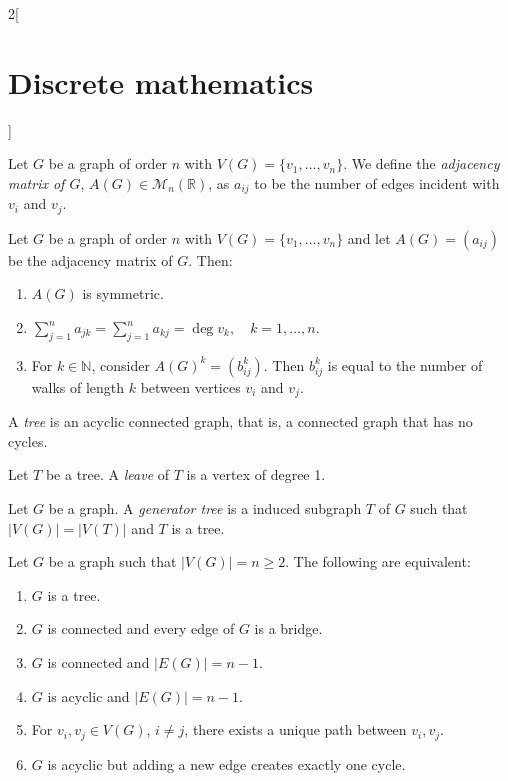 \documentclass[class=article,10pt,crop=false]{standalone}
\begin{document}
\begin{multicols}{2}[\section{Discrete mathematics}]
\begin{definition}
Let $G$ be a graph of order $n$ with $V(G)=\{v_1,\ldots,v_n\}$. We define the \textit{adjacency matrix of $G$}, $A(G)\in\mathcal{M}_n(\mathbb{R})$, as $a_{ij}$ to be the number of edges incident with $v_i$ and $v_j$.
\end{definition}
\begin{prop}
Let $G$ be a graph of order $n$ with $V(G)=\{v_1,\ldots,v_n\}$ and let $A(G)=(a_{ij})$ be the adjacency matrix of $G$. Then:
\begin{enumerate}
    \item $A(G)$ is symmetric.
    \item $\displaystyle\sum_{j=1}^n a_{jk}=\sum_{j=1}^n a_{kj}=\deg v_k,\quad k=1,\ldots,n$.
    \item For $k\in\mathbb{N}$, consider $A(G)^k=(b_{ij}^k)$. Then $b_{ij}^k$ is equal to the number of walks of length $k$ between vertices $v_i$ and $v_j$.
\end{enumerate}
\end{prop}
\begin{definition}
A \textit{tree} is an acyclic connected graph, that is, a connected graph that has no cycles.
\end{definition}
\begin{definition}
Let $T$ be a tree. A \textit{leave} of $T$ is a vertex of degree 1.
\end{definition}
\begin{definition}
Let $G$ be a graph. A \textit{generator tree} is a induced subgraph $T$ of $G$ such that $|V(G)|=|V(T)|$ and $T$ is a tree.
\end{definition}
\begin{prop}
Let $G$ be a graph such that $|V(G)|=n\geq 2$. The following are equivalent:
\begin{enumerate}
    \item $G$ is a tree.
    \item $G$ is connected and every edge of $G$ is a bridge.
    \item $G$ is connected and $|E(G)|=n-1$.
    \item $G$ is acyclic and $|E(G)|=n-1$.
    \item For $v_i,v_j\in V(G)$, $i\ne j$, there exists a unique path between $v_i,v_j$. 
    \item $G$ is acyclic but adding a new edge creates exactly one cycle.
\end{enumerate}
\end{prop}
\begin{definition}

\end{definition}
\end{multicols}
\end{document}
